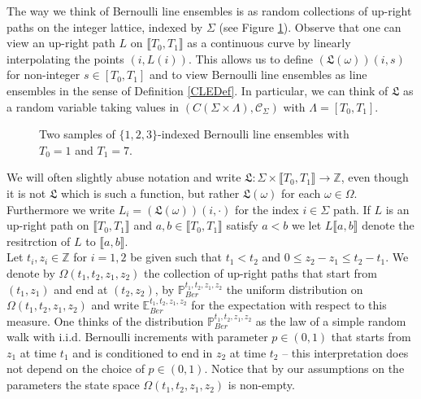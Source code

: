The way we think of Bernoulli line ensembles is as random collections of up-right paths on the integer lattice, indexed by $\Sigma$ (see Figure \ref{S3_1}). Observe that one can view an up-right path $L$ on $\llbracket T_0, T_1 \rrbracket$ as a continuous curve by linearly interpolating the points $(i, L(i))$. This allows us to define $ (\mathfrak{L}(\omega)) (i, s)$ for non-integer $s \in [T_0,T_1]$ and to view Bernoulli line ensembles as line ensembles in the sense of Definition \ref{CLEDef}. In particular, we can think of $\mathfrak{L}$ as a random variable taking values in $\left(C (\Sigma \times \Lambda), \mathcal{C}_{\Sigma}\right)$ with $\Lambda = [T_0, T_1]$.
\begin{figure}[h]
\centering
{}
\caption{Two samples of $\{1,2,3\}$-indexed Bernoulli line ensembles with $T_0 = 1$ and $T_1 = 7$. }
\label{S3_1}
\end{figure}
We will often slightly abuse notation and write $\mathfrak{L}: \Sigma \times \llbracket T_0, T_1 \rrbracket \rightarrow \mathbb{Z}$, even though it is not $\mathfrak{L}$ which is such a function, but rather $\mathfrak{L}(\omega)$ for each $\omega \in \Omega$. Furthermore we write $L_i = (\mathfrak{L}(\omega)) (i, \cdot)$ for the index $i \in \Sigma$ path. If $L$ is an up-right path on $\llbracket T_0, T_1 \rrbracket$ and $a, b \in \llbracket T_0, T_1 \rrbracket$ satisfy $a < b$ we let $L\llbracket a, b \rrbracket$ denote the resitrction of $L$ to $\llbracket a,b\rrbracket$. \\

Let $t_i, z_i \in \mathbb{Z}$ for $i = 1,2$ be given such that $t_1 < t_2$ and $0 \leq z_2 - z_1 \leq t_2 - t_1$. We denote by $\Omega(t_1,t_2,z_1,z_2)$ the collection of up-right paths that start from $(t_1,z_1)$ and end at $(t_2,z_2)$, by $\mathbb{P}_{Ber}^{t_1,t_2, z_1, z_2}$ the uniform distribution on $\Omega(t_1,t_2,z_1,z_2)$ and write $\mathbb{E}^{t_1,t_2,z_1,z_2}_{Ber}$ for the expectation with respect to this measure. One thinks of the distribution $\mathbb{P}_{Ber}^{t_1,t_2, z_1, z_2}$ as the law of a simple random walk with i.i.d. Bernoulli increments with parameter $p \in (0,1)$ that starts from $z_1$ at time $t_1$ and is conditioned to end in $z_2$ at time $t_2$ -- this interpretation does not depend on the choice of $p \in (0,1)$. Notice that by our assumptions on the parameters the state space $\Omega(t_1,t_2,z_1,z_2)$ is non-empty.  

